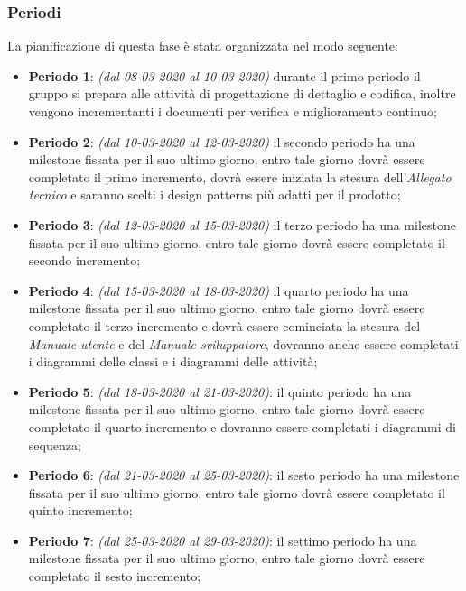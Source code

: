 \subsubsection{Periodi}
La pianificazione di questa fase è stata organizzata nel modo seguente:
\begin{itemize}
\item \textbf{Periodo 1}: \textit{(dal 08-03-2020 al 10-03-2020)} durante il primo periodo il gruppo si prepara alle attività di progettazione di dettaglio e codifica, inoltre vengono incrementanti i documenti per verifica e miglioramento continuo;

\item \textbf{Periodo 2}: \textit{(dal 10-03-2020 al 12-03-2020)} il secondo periodo ha una milestone fissata per il suo ultimo giorno, entro tale giorno dovrà essere completato il primo incremento, dovrà essere iniziata la stesura dell'\textit{Allegato tecnico} e saranno scelti i design patterns più adatti per il prodotto;

\item \textbf{Periodo 3}: \textit{(dal 12-03-2020 al 15-03-2020)} il terzo periodo ha una milestone fissata per il suo ultimo giorno, entro tale giorno dovrà essere completato il secondo incremento;

\item \textbf{Periodo 4}: \textit{(dal 15-03-2020 al 18-03-2020)} il quarto periodo ha una milestone fissata per il suo ultimo giorno, entro tale giorno dovrà essere completato il terzo incremento e dovrà essere cominciata la stesura del \textit{Manuale utente} e del \textit{Manuale sviluppatore}, dovranno anche essere completati i diagrammi delle classi e i diagrammi delle attività;

\item \textbf{Periodo 5}: \textit{(dal 18-03-2020 al 21-03-2020)}: il quinto periodo ha una milestone fissata per il suo ultimo giorno, entro tale giorno dovrà essere completato il quarto incremento e dovranno essere completati i diagrammi di sequenza;

\item \textbf{Periodo 6}: \textit{(dal 21-03-2020 al 25-03-2020)}: il sesto periodo ha una milestone fissata per il suo ultimo giorno, entro tale giorno dovrà essere completato il quinto incremento;

\item \textbf{Periodo 7}: \textit{(dal 25-03-2020 al 29-03-2020)}: il settimo periodo ha una milestone fissata per il suo ultimo giorno, entro tale giorno dovrà essere completato il sesto incremento;


\end{itemize}
